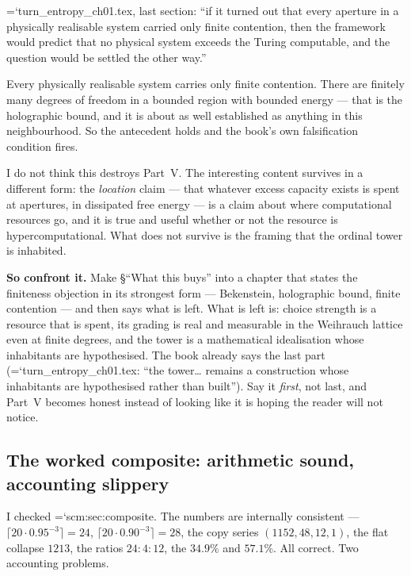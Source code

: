 \documentclass[11pt,letterpaper]{article}
\newcommand{\loc}[1]{{\small\ttfamily\color{accent}\hyphenchar\font=`\-\relax #1}}
\newcommand{\fnd}[1]{\textbf{\color{warn}#1}}
\begin{document}
\loc{turn\_entropy\_ch01.tex}, last section: ``if it turned out that
every aperture in a physically realisable system carried only finite
contention, then the framework would predict that no physical system
exceeds the Turing computable, and the question would be settled the
other way.''

Every physically realisable system carries only finite contention.
There are finitely many degrees of freedom in a bounded region with
bounded energy --- that is the holographic bound, and it is about as
well established as anything in this neighbourhood. So the antecedent
holds and the book's own falsification condition fires.

I do not think this destroys Part~V. The interesting content survives
in a different form: the \emph{location} claim --- that whatever excess
capacity exists is spent at apertures, in dissipated free energy --- is
a claim about where computational resources go, and it is true and
useful whether or not the resource is hypercomputational. What does not
survive is the framing that the ordinal tower is inhabited.

\fnd{So confront it.} Make \S``What this buys'' into a chapter that
states the finiteness objection in its strongest form --- Bekenstein,
holographic bound, finite contention --- and then says what is left.
What is left is: choice strength is a resource that is spent, its
grading is real and measurable in the Weihrauch lattice even at finite
degrees, and the tower is a mathematical idealisation whose inhabitants
are hypothesised. The book already says the last part
(\loc{turn\_entropy\_ch01.tex}: ``the tower\ldots{} remains a
construction whose inhabitants are hypothesised rather than built'').
Say it \emph{first}, not last, and Part~V becomes honest instead of
looking like it is hoping the reader will not notice.

\subsection*{The worked composite: arithmetic sound, accounting slippery}

I checked \loc{scm:sec:composite}. The numbers are internally
consistent --- $\lceil 20 \cdot 0.95^{-3}\rceil = 24$,
$\lceil 20 \cdot 0.90^{-3}\rceil = 28$, the copy series
$(1152, 48, 12, 1)$, the flat collapse $1213$, the ratios $24 : 4 :
12$, the $34.9\%$ and $57.1\%$. All correct. Two accounting problems.
\end{document}
